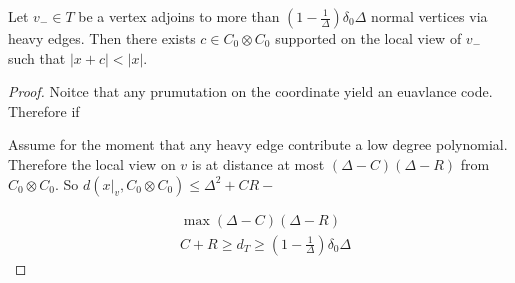 \begin{claim}
  Let $v_{-} \in T$ be a vertex adjoins to more than $\left( 1 - \frac{1}{\Delta} \right)\delta_{0}\Delta$ normal vertices via heavy edges. Then there exists $c \in C_{0} \otimes C_{0}$ supported on the local view of $v_{-}$ such that $|x + c| < |x|$. 
\end{claim}

\begin{proof}
  Noitce that any prumutation on the coordinate yield an euavlance code. Therefore if      

  \begin{center}
\end{center}


Assume for the moment that any heavy edge contribute a low degree polynomial. Therefore the local view on $v$ is at distance at most $ \left( \Delta - C \right)\left( \Delta - R \right) $ from $C_{0}\otimes C_{0}$. So $d(x|_{v}, C_{0}\otimes C_{0}) \le \Delta^{2}+CR -   $ 


\begin{equation*}
  \begin{split}
    & \max \left( \Delta - C \right)\left( \Delta - R  \right) \\ 
    & C + R \ge d_{T} \ge \left( 1 - \frac{1}{\Delta} \right)\delta_{0}\Delta
  \end{split}
\end{equation*}


\end{proof}

